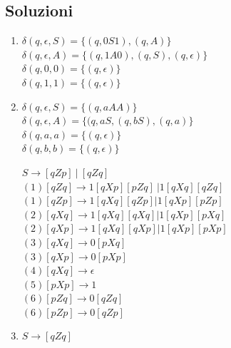 \documentclass[a4paper,11pt]{article}
\begin{document}
\subsection{Soluzioni}
\begin{enumerate}
    \item \begin{minipage}{\linewidth}
        $\delta (q, \epsilon, S) = \{(q,0S1), (q,A)\}$\\
        $\delta (q, \epsilon, A) = \{(q,1A0), (q,S), (q, \epsilon)\}$\\
        $\delta (q, 0, 0) = \{(q,\epsilon)\}$\\
        $\delta (q, 1, 1) = \{(q,\epsilon)\}$\\
    \end{minipage}
    \item \begin{minipage}{\linewidth}
        $\delta (q, \epsilon, S) = \{(q,aAA)\}$\\
        $\delta (q, \epsilon, A) = \{(q, aS, (q,bS), (q, a)\}$\\
        $\delta (q, a,a) = \{(q,\epsilon)\}$\\
        $\delta (q, b,b) = \{(q,\epsilon)\}$\\
    \end{minipage}
    \begin{minipage}{\linewidth}
        $S \rightarrow [qZp]\ |\ [qZq]$\\
        $(1) [qZq] \rightarrow 1[qXp][pZq]\ | 1[qXq][qZq]$\\
        $(1) [qZp] \rightarrow 1[qXq][qZp] | 1[qXp][pZp]$\\
        $(2) [qXq] \rightarrow 1[qXq][qXq] | 1[qXp][pXq]$\\
        $(2) [qXp] \rightarrow 1[qXq][qXp] | 1[qXp][pXp]$\\
        $(3) [qXq] \rightarrow 0[pXq]$\\
        $(3) [qXp] \rightarrow 0[pXp]$\\
        $(4) [qXq] \rightarrow \epsilon$\\
        $(5) [pXp] \rightarrow 1$\\
        $(6) [pZq] \rightarrow 0[qZq]$\\
        $(6) [pZp] \rightarrow 0[qZp]$\\
      \end{minipage}
      \item \begin{minipage}{\linewidth}
        $S \rightarrow [qZq]$\\

\end{minipage}
\end{enumerate}
\end{document}
